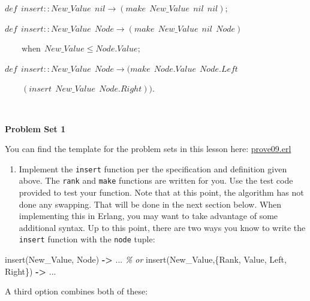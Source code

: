 \documentclass[
]{book}
\newenvironment{Shaded}{\begin{snugshade}}{\end{snugshade}}
\newcommand{\CommentTok}[1]{\textcolor[rgb]{0.56,0.35,0.01}{\textit{#1}}}
\newcommand{\FunctionTok}[1]{\textcolor[rgb]{0.00,0.00,0.00}{#1}}
\newcommand{\OperatorTok}[1]{\textcolor[rgb]{0.81,0.36,0.00}{\textbf{#1}}}
\newcommand{\VariableTok}[1]{\textcolor[rgb]{0.00,0.00,0.00}{#1}}
\providecommand{\tightlist}{%
  \setlength{\itemsep}{0pt}\setlength{\parskip}{0pt}}
\begin{document}
\begin{formulabox}
\(\mathit{def} ~ ~ insert :: New\_Value ~ ~ nil \rightarrow (make ~ ~ New\_Value ~ ~ nil ~ ~ nil);\)

\(\mathit{def} ~ ~ insert :: New\_Value ~ ~ Node \rightarrow (make ~ ~ New\_Value ~ ~ nil ~ ~ Node)~ ~\)

\(\quad \quad \text{when} ~ ~ New\_Value \leq Node.Value;\)

\(\mathit{def} ~ ~ insert :: New\_Value ~ ~ Node \rightarrow (make ~ ~ Node.Value ~ ~ Node.\mathit{Left} ~ ~\)

\(\quad \quad (insert ~ ~ New\_Value ~ ~ Node.Right)).\)

\end{formulabox}

\(\nonumber\)

\begin{problembox}
\textbf{Problem Set 1}

You can find the template for the problem sets in this lesson here: \href{proves/prove09.erl}{prove09.erl}

\begin{enumerate}
\def\labelenumi{\arabic{enumi}.}
\tightlist
\item
  Implement the \texttt{insert} function per the specification and definition given above. The \texttt{rank} and \texttt{make} functions are written for you. Use the test code provided to test your function. Note that at this point, the algorithm has not done any swapping. That will be done in the next section below. When implementing this in Erlang, you may want to take advantage of some additional syntax. Up to this point, there are two ways you know to write the \texttt{insert} function with the \texttt{node} tuple:
\end{enumerate}

\begin{Shaded}
\begin{Highlighting}[]
\FunctionTok{insert(}\VariableTok{New\_Value}\FunctionTok{,} \VariableTok{Node}\FunctionTok{)} \OperatorTok{{-}\textgreater{}} \FunctionTok{...}
\CommentTok{\% or}
\FunctionTok{insert(}\VariableTok{New\_Value}\FunctionTok{,\{}\VariableTok{Rank}\FunctionTok{,} \VariableTok{Value}\FunctionTok{,} \VariableTok{Left}\FunctionTok{,} \VariableTok{Right}\FunctionTok{\})} \OperatorTok{{-}\textgreater{}} \FunctionTok{...}
\end{Highlighting}
\end{Shaded}

A third option combines both of these:


\end{problembox}
\end{document}

